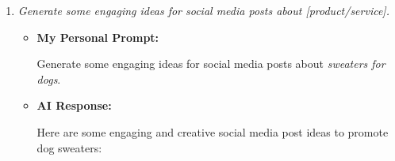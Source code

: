 \documentclass[12pt]{article}
\begin{document}
\begin{enumerate}
\begin{itemize}
        \item \emph{I would like you to create an agenda for my meeting about \emph{my tech nonprofit}. In the meeting, I would like to discuss \emph{fundraising, community engagement, and procedural changes}. I’d like it to be set out so the meeting runs smoothly. The scheduled meeting duration is \emph{one hour}.}

        \item \textbf{AI Response:}

        \begin{verbatim}
# Tech Nonprofit Meeting Agenda

**Date:** [Insert Date]  
**Time:** [Insert Time]  
**Duration:** 1 Hour  
**Location:** [Insert Location or Link]  
**Facilitator:** [Insert Name]

## Agenda Overview (5 minutes)  
- Welcome and objectives:
  1. Fundraising.
  2. Community engagement.  
  3. Procedural changes.

## Fundraising (15 minutes)  
- Current progress and opportunities.  
- Donor outreach and budgeting.  
- Assign next steps.

## Community Engagement (10 minutes)  
- Current involvement and ideas for improvement.  
- Discuss partnerships and visibility.  
- Assign leads for initiatives.

## Procedural Changes (10 minutes)  
- Summary of changes and benefits.  
- Team feedback and implementation plan.  
- Assign responsibilities.

## Wrap-Up (5 minutes)  
- Recap action items and set deadlines.  
- Confirm next meeting date.  
- Thank attendees.

**Adjourn**
        \end{verbatim}
    \end{itemize}

    \item \emph{Generate some engaging ideas for social media posts about [product/service].}

    \begin{itemize}
       
        \item \textbf{My Personal Prompt:}
        
        Generate some engaging ideas for social media posts about \emph{sweaters for dogs}.

        \item \textbf{AI Response:}   

Here are some engaging and creative social media post ideas to promote dog sweaters:


\end{itemize}
\end{enumerate}
\end{document}
